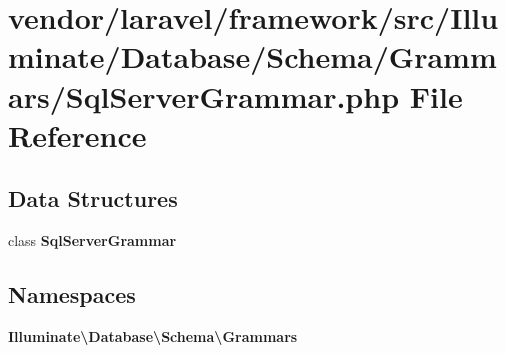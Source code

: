 \section{vendor/laravel/framework/src/\+Illuminate/\+Database/\+Schema/\+Grammars/\+Sql\+Server\+Grammar.php File Reference}
\label{_schema_2_grammars_2_sql_server_grammar_8php}
\subsection*{Data Structures}
\begin{DoxyCompactItemize}
\item 
class {\bf Sql\+Server\+Grammar}
\end{DoxyCompactItemize}
\subsection*{Namespaces}
\begin{DoxyCompactItemize}
\item 
 {\bf Illuminate\textbackslash{}\+Database\textbackslash{}\+Schema\textbackslash{}\+Grammars}
\end{DoxyCompactItemize}
